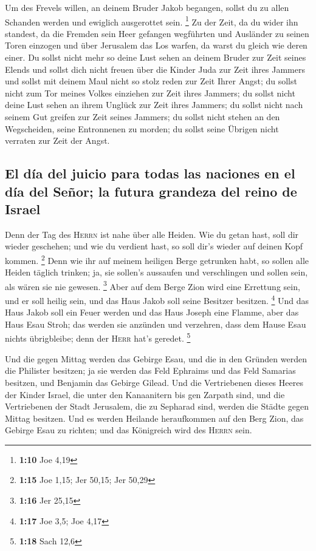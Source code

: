  Um des Frevels willen, an deinem Bruder Jakob begangen,
sollst du zu allen Schanden werden und ewiglich ausgerottet sein.
\footnote{\textbf{1:10} Joe 4,19}  Zu der Zeit, da du
wider ihn standest, da die Fremden sein Heer gefangen wegführten und
Ausländer zu seinen Toren einzogen und über Jerusalem das Los warfen, da
warst du gleich wie deren einer.  Du sollst nicht mehr so
deine Lust sehen an deinem Bruder zur Zeit seines Elends und sollst dich
nicht freuen über die Kinder Juda zur Zeit ihres Jammers und sollst mit
deinem Maul nicht so stolz reden zur Zeit Ihrer Angst; 
du sollst nicht zum Tor meines Volkes einziehen zur Zeit ihres Jammers;
du sollst nicht deine Lust sehen an ihrem Unglück zur Zeit ihres
Jammers; du sollst nicht nach seinem Gut greifen zur Zeit seines
Jammers;  du sollst nicht stehen an den Wegscheiden,
seine Entronnenen zu morden; du sollst seine Übrigen nicht verraten zur
Zeit der Angst.

\hypertarget{el-duxeda-del-juicio-para-todas-las-naciones-en-el-duxeda-del-seuxf1or-la-futura-grandeza-del-reino-de-israel}{%
\subsection{El día del juicio para todas las naciones en el día del
Señor; la futura grandeza del reino de
Israel}\label{el-duxeda-del-juicio-para-todas-las-naciones-en-el-duxeda-del-seuxf1or-la-futura-grandeza-del-reino-de-israel}}

 Denn der Tag des \textsc{Herrn} ist nahe über alle
Heiden. Wie du getan hast, soll dir wieder geschehen; und wie du
verdient hast, so soll dir's wieder auf deinen Kopf kommen. \footnote{\textbf{1:15}
  Joe 1,15; Jer 50,15; Jer 50,29}  Denn wie ihr auf
meinem heiligen Berge getrunken habt, so sollen alle Heiden täglich
trinken; ja, sie sollen's aussaufen und verschlingen und sollen sein,
als wären sie nie gewesen. \footnote{\textbf{1:16} Jer 25,15}
 Aber auf dem Berge Zion wird eine Errettung sein, und er
soll heilig sein, und das Haus Jakob soll seine Besitzer besitzen.
\footnote{\textbf{1:17} Joe 3,5; Joe 4,17}  Und das Haus
Jakob soll ein Feuer werden und das Haus Joseph eine Flamme, aber das
Haus Esau Stroh; das werden sie anzünden und verzehren, dass dem Hause
Esau nichts übrigbleibe; denn der \textsc{Herr} hat's geredet.
\footnote{\textbf{1:18} Sach 12,6}

 Und die gegen Mittag werden das Gebirge Esau, und die in
den Gründen werden die Philister besitzen; ja sie werden das Feld
Ephraims und das Feld Samarias besitzen, und Benjamin das Gebirge
Gilead.  Und die Vertriebenen dieses Heeres der Kinder
Israel, die unter den Kanaanitern bis gen Zarpath sind, und die
Vertriebenen der Stadt Jerusalem, die zu Sepharad sind, werden die
Städte gegen Mittag besitzen.  Und es werden Heilande
heraufkommen auf den Berg Zion, das Gebirge Esau zu richten; und das
Königreich wird des \textsc{Herrn} sein.
